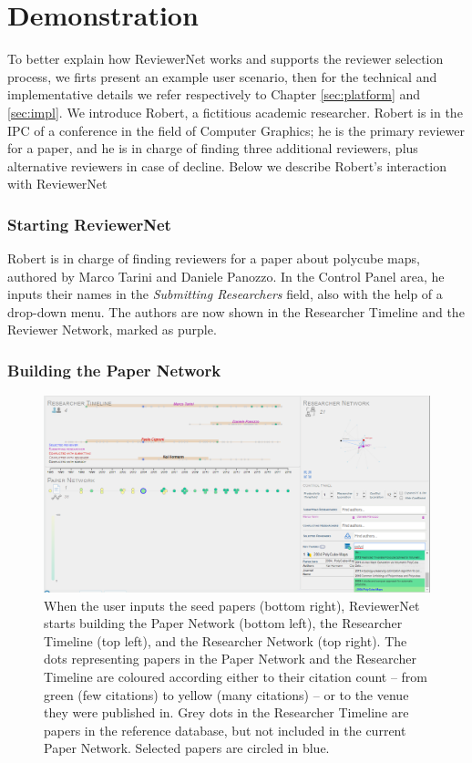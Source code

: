 \chapter{Demonstration}\label{sec:demonstration}
To better explain how ReviewerNet works and supports the reviewer selection process, we firts present an example user scenario, then for the technical and implementative details we refer respectively to Chapter \ref{sec:platform} and \ref{sec:impl}.
We introduce Robert, a fictitious academic researcher. Robert is in the IPC of a conference in the field of Computer Graphics; he is the primary reviewer for a paper, and he is in charge of finding three additional reviewers, plus alternative reviewers in case of decline. 
Below we describe Robert's interaction with ReviewerNet
\subsection*{Starting ReviewerNet}

Robert is in charge of finding reviewers for a paper about polycube maps, authored by Marco Tarini and Daniele Panozzo. In the Control Panel area, he inputs their names in the \emph{Submitting Researchers} field, also with the help of a drop-down menu. The authors are now shown in the Researcher Timeline and the Reviewer Network, marked as purple. 
\subsection*{Building the Paper Network} 

\begin{figure}[!ht]
    \centering
    \includegraphics[width=\textwidth]{fig/insertion_manual.png}		
    \caption{When the user inputs the seed papers (bottom right), ReviewerNet starts building the Paper Network (bottom left), the Researcher Timeline (top left), and the Researcher Network (top right). The dots representing papers in the Paper Network and the Researcher Timeline are coloured according {either to their citation count -- from green (few citations) to yellow (many citations) -- or to the venue they were published in}. Grey dots in the Researcher Timeline are papers in the reference database, but not included in the current Paper Network. Selected papers are circled in blue.}%
    \label{fig:keypapers}
\end{figure}

